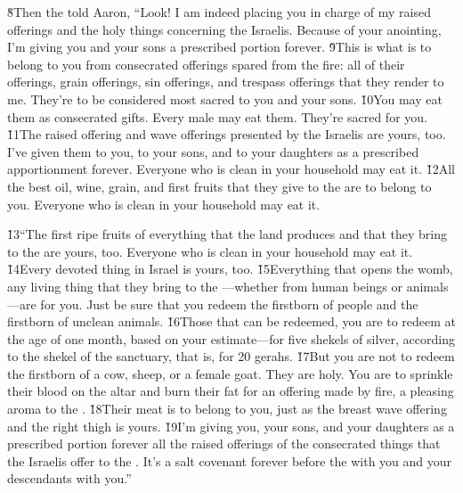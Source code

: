 \v{8}Then the  told Aaron, ``Look! I am indeed placing you in charge of my raised offerings and the holy things concerning the Israelis. Because of your anointing, I'm giving you and your sons a prescribed portion forever. \v{9}This is what is to belong to you from consecrated offerings spared from the fire: all of their offerings, grain offerings, sin offerings, and trespass offerings that they render to me. They're to be considered most sacred to you and your sons. \v{10}You may eat them as consecrated gifts. Every male may eat them. They're sacred for you. \v{11}The raised offering and wave offerings presented by the Israelis are yours, too. I've given them to you, to your sons, and to your daughters as a prescribed apportionment forever. Everyone who is clean in your household may eat it. \v{12}All the best oil, wine, grain, and first fruits that they give to the  are to belong to you. Everyone who is clean in your household may eat it.

\v{13}``The first ripe fruits of everything that the land produces and that they bring to the  are yours, too. Everyone who is clean in your household may eat it. \v{14}Every devoted thing in Israel is yours, too. \v{15}Everything that opens the womb, any living thing that they bring to the ---whether from human beings or animals---are for you. Just be sure that you redeem the firstborn of people and the firstborn of unclean animals. \v{16}Those that can be redeemed, you are to redeem at the age of one month, based on your estimate---for five shekels of silver, according to the shekel of the sanctuary, that is, for 20 gerahs. \v{17}But you are not to redeem the firstborn of a cow, sheep, or a female goat. They are holy. You are to sprinkle their blood on the altar and burn their fat for an offering made by fire, a pleasing aroma to the . \v{18}Their meat is to belong to you, just as the breast wave offering and the right thigh is yours. \v{19}I'm giving you, your sons, and your daughters as a prescribed portion forever all the raised offerings of the consecrated things that the Israelis offer to the . It's a salt covenant forever before the  with you and your descendants with you.''

